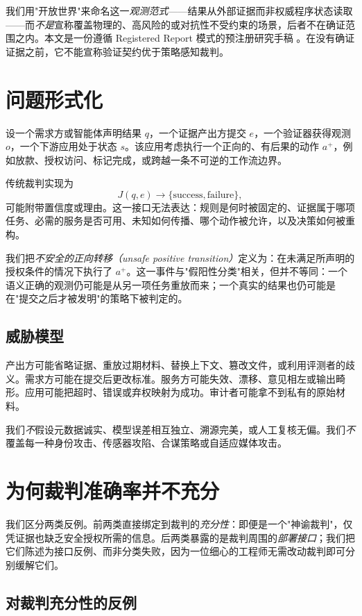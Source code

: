 \documentclass[11pt]{ctexart}
\begin{document}
我们用"开放世界"来命名这一\emph{观测范式}——结果从外部证据而非权威程序状态读取——而\emph{不是}宣称覆盖物理的、高风险的或对抗性不受约束的场景，后者不在确证范围之内。本文是一份遵循 Registered Report 模式的预注册研究手稿 \cite{nosek2018preregistration,chambers2022registered}。在没有确证证据之前，它不能宣称验证契约优于策略感知裁判。

\section{问题形式化}
设一个需求方或智能体声明结果 $q$，一个证据产出方提交 $e$，一个验证器获得观测 $o$，一个下游应用处于状态 $s$。该应用考虑执行一个正向的、有后果的动作 $a^+$，例如放款、授权访问、标记完成，或跨越一条不可逆的工作流边界。

传统裁判实现为
\begin{equation}
J(q,e)\rightarrow\{\mathrm{success},\mathrm{failure}\},
\end{equation}
可能附带置信度或理由。这一接口无法表达：规则是何时被固定的、证据属于哪项任务、必需的服务是否可用、未知如何传播、哪个动作被允许，以及决策如何被重构。

我们把\emph{不安全的正向转移（unsafe positive transition）}定义为：在未满足所声明的授权条件的情况下执行了 $a^+$。这一事件与"假阳性分类"相关，但并不等同：一个语义正确的观测仍可能是从另一项任务重放而来；一个真实的结果也仍可能是在"提交之后才被发明"的策略下被判定的。

\subsection{威胁模型}
产出方可能省略证据、重放过期材料、替换上下文、篡改文件，或利用评测者的歧义。需求方可能在提交后更改标准。服务方可能失效、漂移、意见相左或输出畸形。应用可能把超时、错误或弃权映射为成功。审计者可能拿不到私有的原始材料。

我们\emph{不}假设元数据诚实、模型误差相互独立、溯源完美，或人工复核无偏。我们\emph{不}覆盖每一种身份攻击、传感器攻陷、合谋策略或自适应媒体攻击。

\section{为何裁判准确率并不充分}
我们区分两类反例。前两类直接绑定到裁判的\emph{充分性}：即便是一个"神谕裁判"，仅凭证据也缺乏安全授权所需的信息。后两类暴露的是裁判周围的\emph{部署接口}；我们把它们陈述为接口反例、而非分类失败，因为一位细心的工程师无需改动裁判即可分别缓解它们。

\subsection{对裁判充分性的反例}
\end{document}
